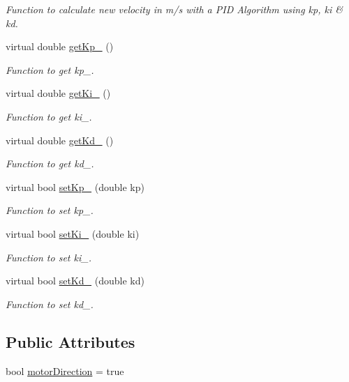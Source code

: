 \begin{DoxyCompactItemize}
\begin{DoxyCompactList}\small\item\em Function to calculate new velocity in m/s with a P\+ID Algorithm using kp, ki \& kd. \end{DoxyCompactList}\item 
virtual double \hyperlink{class_navigation_ab1469d74f4838a9d32a8647d22701f9f}{get\+Kp\+\_\+} ()
\begin{DoxyCompactList}\small\item\em Function to get kp\+\_\+. \end{DoxyCompactList}\item 
virtual double \hyperlink{class_navigation_a1a84392d6cce3f60df452ab482b5647c}{get\+Ki\+\_\+} ()
\begin{DoxyCompactList}\small\item\em Function to get ki\+\_\+. \end{DoxyCompactList}\item 
virtual double \hyperlink{class_navigation_ac6441bb601483166ef7a8081b76f634d}{get\+Kd\+\_\+} ()
\begin{DoxyCompactList}\small\item\em Function to get kd\+\_\+. \end{DoxyCompactList}\item 
virtual bool \hyperlink{class_navigation_a6dd95f46ff4ecc69895452a1879c30af}{set\+Kp\+\_\+} (double kp)
\begin{DoxyCompactList}\small\item\em Function to set kp\+\_\+. \end{DoxyCompactList}\item 
virtual bool \hyperlink{class_navigation_a539d10206ceb162171e39c36e8aa8f0f}{set\+Ki\+\_\+} (double ki)
\begin{DoxyCompactList}\small\item\em Function to set ki\+\_\+. \end{DoxyCompactList}\item 
virtual bool \hyperlink{class_navigation_a4986e4357d9707ddf92cf8f559ef3dce}{set\+Kd\+\_\+} (double kd)
\begin{DoxyCompactList}\small\item\em Function to set kd\+\_\+. \end{DoxyCompactList}\end{DoxyCompactItemize}
\subsection*{Public Attributes}
\begin{DoxyCompactItemize}
\item 
bool \hyperlink{class_navigation_ad7d7a5d5d1abe99e6b0f31ddb4794252}{motor\+Direction} = true
\end{DoxyCompactItemize}


